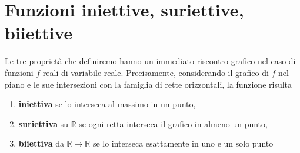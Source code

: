 \documentclass{book}
\begin{document}
\section{Funzioni iniettive, suriettive, biiettive}
Le tre proprietà che definiremo hanno un immediato riscontro grafico
nel caso di funzioni \(f\) reali di variabile reale. Precisamente, considerando il
grafico di \(f\) nel piano e le sue intersezioni con la famiglia di rette orizzontali,
la funzione risulta
\begin{enumerate}
    \item \textbf{iniettiva} se lo interseca al massimo in un punto,
    \item \textbf{suriettiva} su \(\mathbb{R}\) se ogni retta interseca il grafico in almeno un punto,
    \item \textbf{biiettiva} da \(\mathbb{R} \rightarrow \mathbb{R}\) se lo interseca esattamente in uno e un solo punto
\end{enumerate}
\end{document}
